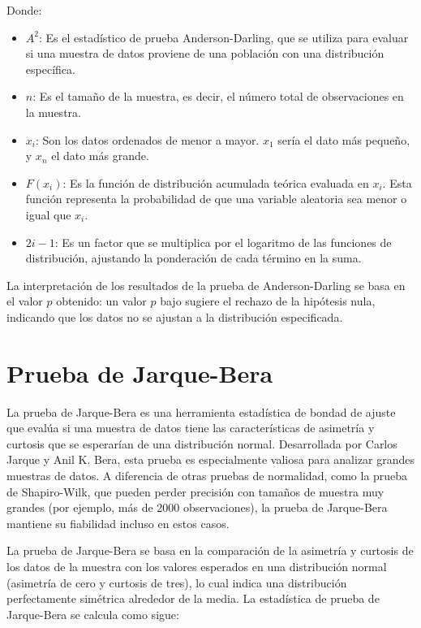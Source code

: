 \documentclass{article}
\begin{document}
Donde:
\begin{itemize}
    \item \(A^2\): Es el estadístico de prueba Anderson-Darling, que se utiliza para evaluar si una muestra de datos proviene de una población con una distribución específica.
    \item \(n\): Es el tamaño de la muestra, es decir, el número total de observaciones en la muestra.
    \item \(x_i\): Son los datos ordenados de menor a mayor. \(x_1\) sería el dato más pequeño, y \(x_n\) el dato más grande.
    \item \(F(x_i)\): Es la función de distribución acumulada teórica evaluada en \(x_i\). Esta función representa la probabilidad de que una variable aleatoria sea menor o igual que \(x_i\).
    \item \(2i-1\): Es un factor que se multiplica por el logaritmo de las funciones de distribución, ajustando la ponderación de cada término en la suma.
\end{itemize}

La interpretación de los resultados de la prueba de Anderson-Darling se basa en el valor \(p\) obtenido: un valor \(p\) bajo sugiere el rechazo de la hipótesis nula, indicando que los datos no se ajustan a la distribución especificada.

\section{Prueba de Jarque-Bera}

La prueba de Jarque-Bera es una herramienta estadística de bondad de ajuste que evalúa si una muestra de datos tiene las características de asimetría y curtosis que se esperarían de una distribución normal. Desarrollada por Carlos Jarque y Anil K. Bera, esta prueba es especialmente valiosa para analizar grandes muestras de datos. A diferencia de otras pruebas de normalidad, como la prueba de Shapiro-Wilk, que pueden perder precisión con tamaños de muestra muy grandes (por ejemplo, más de 2000 observaciones), la prueba de Jarque-Bera mantiene su fiabilidad incluso en estos casos.

La prueba de Jarque-Bera se basa en la comparación de la asimetría y curtosis de los datos de la muestra con los valores esperados en una distribución normal (asimetría de cero y curtosis de tres), lo cual indica una distribución perfectamente simétrica alrededor de la media. La estadística de prueba de Jarque-Bera se calcula como sigue:
\end{document}
